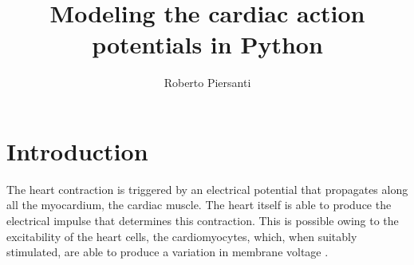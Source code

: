 \documentclass[11pt,a4paper]{article}
\begin{document}
\setcounter{page}{1}

\title{Modeling the cardiac action potentials in Python} 

\author[a]{Roberto Piersanti}


\maketitle 

\date{}

\vspace*{0.5cm}

\begin{abstract}

\end{abstract}

\section{Introduction}\label{sec:intro}
The heart contraction is triggered by an electrical potential that propagates along all the myocardium, the cardiac muscle. The heart itself is able to produce the electrical impulse that determines this contraction. This
is possible owing to the excitability of the heart cells, the cardiomyocytes,
which, when suitably stimulated, are able to produce a variation in membrane voltage \cite{quarteroni2019}.
\end{document}
